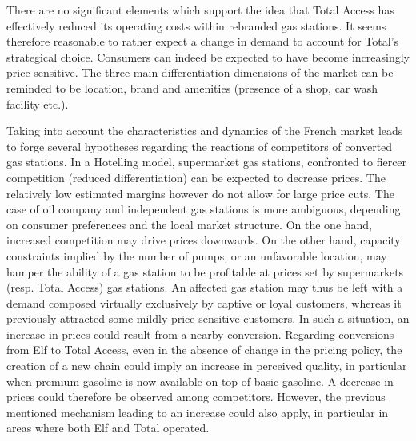 \documentclass[english]{article}
\begin{document}
There are no significant elements which support the idea that Total Access has effectively reduced its operating costs within rebranded gas stations. It seems therefore reasonable to rather expect a change in demand to account for Total's strategical choice. Consumers can indeed be expected to have become increasingly price sensitive. The three main differentiation dimensions of the market can be reminded to be location, brand and amenities (presence of a shop, car wash facility etc.).\medskip{}

Taking into account the characteristics and dynamics of the French market leads to forge several hypotheses regarding the reactions of competitors of converted gas stations. In a Hotelling model, supermarket gas stations, confronted to fiercer competition (reduced differentiation) can be expected to decrease prices. The relatively low estimated margins however do not allow for large price cuts. The case of oil company and independent gas stations is more ambiguous, depending on consumer preferences and the local market structure. On the one hand, increased competition may drive prices downwards. On the other hand, capacity constraints implied by the number of pumps, or an unfavorable location, may hamper the ability of a gas station to be profitable at prices set by supermarkets (resp. Total Access) gas stations. An affected gas station may thus be left with a demand composed virtually exclusively by captive or loyal customers, whereas it previously attracted some mildly price sensitive customers. In such a situation, an increase in prices could result from a nearby conversion. Regarding conversions from Elf to Total Access, even in the absence of change in the pricing policy, the creation of a new chain could imply an increase in perceived quality, in particular when premium gasoline is now available on top of basic gasoline. A decrease in prices could therefore be observed among competitors. However, the previous mentioned mechanism leading to an increase could also apply, in particular in areas where both Elf and Total operated.
\end{document}
